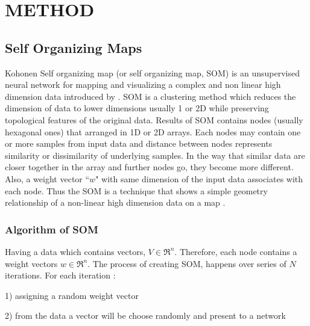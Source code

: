 
\section{METHOD}
 \subsection{Self Organizing Maps}
 
 Kohonen Self organizing map (or self organizing map, SOM) is an unsupervised neural network for mapping and visualizing a complex and non linear high dimension data introduced by \citep{Kohonen82}. 
 SOM is a clustering method which reduces the dimension of data to lower dimensions usually 1 or 2D while preserving topological features of the original data.
 Results of SOM contains nodes (usually hexagonal ones) that arranged in 1D or 2D arrays.
 Each nodes may contain one or more samples from input data and distance between nodes represents similarity or dissimilarity of underlying samples. 
 In the way that similar data are closer together in the array and further nodes go, they become more different.
 Also, a weight vector ``$w$" with same dimension of the input data associates with each node.
 Thus the SOM is a technique that shows a simple geometry relationship of a non-linear high dimension data on a map \citep{Kohonen98}. 
   \subsubsection{Algorithm of SOM} 
   
 Having a data which contains vectors, $V \in \Re^n$. Therefore, each node contains a weight vectors $w\in \Re^n$. The process of creating SOM, happens over series of $N$ iterations. For each iteration :
   
  1) assigning a random weight vector
  
  2) from the data a vector will be choose randomly and present to a network
  
